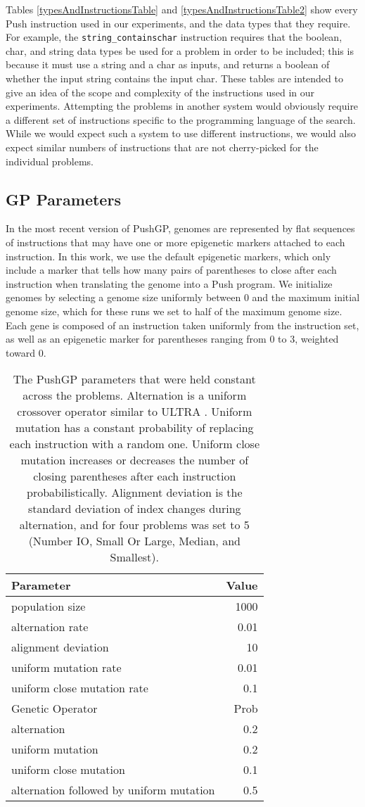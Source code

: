 \documentclass{sig-alternate}
\begin{document}
Tables \ref{typesAndInstructionsTable} and \ref{typesAndInstructionsTable2} show every Push instruction used in our experiments, and the data types that they require. For example, the \texttt{string\_containschar} instruction requires that the boolean, char, and string data types be used for a problem in order to be included; this is because it must use a string and a char as inputs, and returns a boolean of whether the input string contains the input char. These tables are intended to give an idea of the scope and complexity of the instructions used in our experiments. Attempting the problems in another system would obviously require a different set of instructions specific to the programming language of the search. While we would expect such a system to use different instructions, we would also expect similar numbers of instructions that are not cherry-picked for the individual problems.


\subsection{GP Parameters}


In the most recent version of PushGP, genomes are represented by flat sequences of instructions that may have one or more epigenetic markers attached to each instruction. In this work, we use the default epigenetic markers, which only include a marker that tells how many pairs of parentheses to close after each instruction when translating the genome into a Push program. We initialize genomes by selecting a genome size uniformly between 0 and the maximum initial genome size, which for these runs we set to half of the maximum genome size. Each gene is composed of an instruction taken uniformly from the instruction set, as well as an epigenetic marker for parentheses ranging from 0 to 3, weighted toward 0.

\begin{table}%
\centering
\caption{The PushGP parameters that were held constant across the problems. Alternation is a uniform crossover operator similar to ULTRA \cite{spector:2014:GPTP}. Uniform mutation has a constant probability of replacing each instruction with a random one. Uniform close mutation increases or decreases the number of closing parentheses after each instruction probabilistically. Alignment deviation is the standard deviation of index changes during alternation, and for four problems was set to 5 (Number IO, Small Or Large, Median, and Smallest).}
\label{tableGPconstantParams}
\begin{tabular}{l r}
\toprule
Parameter & Value \tabularnewline
\midrule
population size & 1000 \tabularnewline
alternation rate & 0.01 \tabularnewline
alignment deviation & 10 \tabularnewline
uniform mutation rate & 0.01 \tabularnewline
uniform close mutation rate & 0.1 \tabularnewline
\midrule
Genetic Operator & Prob \tabularnewline
\midrule
alternation & 0.2 \tabularnewline
uniform mutation & 0.2 \tabularnewline
uniform close mutation & 0.1 \tabularnewline
alternation followed by uniform mutation & 0.5 \tabularnewline
\bottomrule
\end{tabular}
\end{table}
\end{document}
